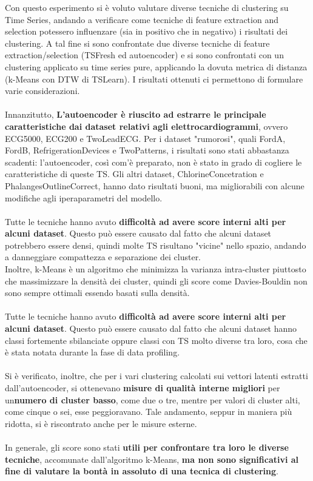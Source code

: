 Con questo esperimento si è voluto valutare diverse tecniche di clustering su Time Series, andando a verificare come tecniche di feature extraction and selection potessero influenzare (sia in positivo che in negativo) i risultati dei clustering.
A tal fine si sono confrontate due diverse tecniche di feature extraction/selection (TSFresh ed autoencoder) e si sono confrontati con un clustering applicato su time series pure, applicando la dovuta metrica di distanza (k-Means con DTW di TSLearn).
I risultati ottenuti ci permettono di formulare varie considerazioni.\\ 
\\
Innanzitutto, \textbf{L'autoencoder è riuscito ad estrarre le principale caratteristiche dai dataset relativi agli elettrocardiogrammi}, ovvero ECG5000, ECG200 e TwoLeadECG.
Per i dataset "rumorosi", quali FordA, FordB, RefrigerationDevices e TwoPatterns, i risultati sono stati abbastanza scadenti: l'autoencoder, così com'è preparato, non è stato in grado di cogliere le caratteristiche di queste TS.
Gli altri dataset, ChlorineConcetration e PhalangesOutlineCorrect, hanno dato risultati buoni, ma migliorabili con alcune modifiche agli iperaparametri del modello.\\
\\
Tutte le tecniche hanno avuto \textbf{difficoltà ad avere score interni alti per alcuni dataset}. Questo può essere causato dal fatto che alcuni dataset potrebbero essere densi, quindi molte TS risultano "vicine" nello spazio, andando a danneggiare compattezza e separazione dei cluster.\\
Inoltre, k-Means è un algoritmo che minimizza la varianza intra-cluster piuttosto che massimizzare la densità dei cluster, quindi gli score come Davies-Bouldin non sono sempre ottimali essendo basati sulla densità.\\
\\
Tutte le tecniche hanno avuto \textbf{difficoltà ad avere score interni alti per alcuni dataset}. Questo può essere causato dal fatto che alcuni dataset hanno classi fortemente sbilanciate oppure classi con TS molto diverse tra loro, cosa che è stata notata durante la fase di data profiling.\\
\\
Si è verificato, inoltre, che per i vari clustering calcolati sui vettori latenti estratti dall'autoencoder, si ottenevano \textbf{misure di qualità interne migliori} per un\textbf{numero di cluster basso}, come due o tre, mentre per valori di cluster alti, come cinque o sei, esse peggioravano.
Tale andamento, seppur in maniera più ridotta, si è riscontrato anche per le misure esterne.\\
\\ 
In generale, gli score sono stati \textbf{utili per confrontare tra loro le diverse tecniche}, accomunate dall'algoritmo k-Means, \textbf{ma non sono significativi al fine di valutare la bontà in assoluto di una tecnica di clustering}.